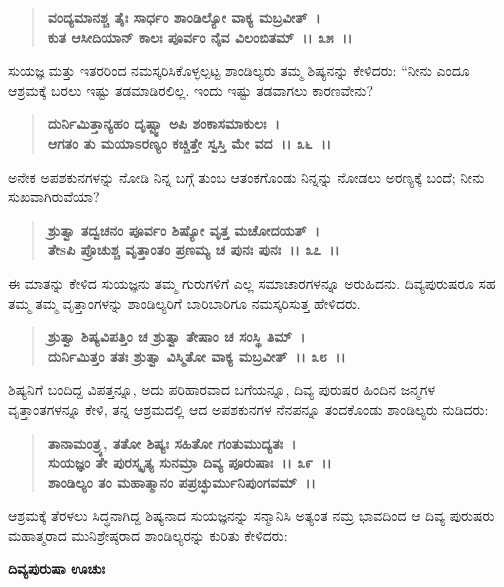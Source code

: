 \begin{verse}
\textbf{ವಂದ್ಯಮಾನಶ್ಚ ತೈಃ ಸಾರ್ಧಂ ಶಾಂಡಿಲ್ಯೋ ವಾಕ್ಯ ಮಬ್ರವೀತ್~।}\\\textbf{ಕುತ ಆಸೀದಿಯಾನ್ ಕಾಲಃ ಪೂರ್ವಂ ನೈವ ವಿಲಂಬಿತಮ್~।। ೩೫~।।}
\end{verse}

ಸುಯಜ್ಞ ಮತ್ತು ಇತರರಿಂದ ನಮಸ್ಕರಿಸಿಕೊಳ್ಳಲ್ಪಟ್ಟ ಶಾಂಡಿಲ್ಯರು ತಮ್ಮ ಶಿಷ್ಯನನ್ನು ಕೇಳಿದರು: “ನೀನು ಎಂದೂ ಆಶ್ರಮಕ್ಕೆ ಬರಲು ಇಷ್ಟು ತಡಮಾಡಿರಲಿಲ್ಲ. ಇಂದು ಇಷ್ಟು ತಡ\-ವಾಗಲು ಕಾರಣವೇನು?

\begin{verse}
\textbf{ದುರ್ನಿಮಿತ್ತಾನ್ಯಹಂ ದೃಷ್ಟ್ವಾ ಅಪಿ ಶಂಕಾಸಮಾಕುಲಃ~।}\\\textbf{ಆಗತಂ ತು ಮಯಾಽರಣ್ಯಂ ಕಚ್ಚಿತ್ತೇ ಸ್ವಸ್ತಿ ಮೇ ವದ~।। ೩೬~।।}
\end{verse}

ಅನೇಕ ಅಪಶಕುನಗಳನ್ನು ನೋಡಿ ನಿನ್ನ ಬಗ್ಗೆ ತುಂಬ ಆತಂಕಗೊಂಡು ನಿನ್ನನ್ನು ನೋಡಲು ಅರಣ್ಯಕ್ಕೆ ಬಂದೆ; ನೀನು ಸುಖವಾಗಿರುವೆಯಾ?

\begin{verse}
\textbf{ಶ್ರುತ್ವಾ ತದ್ವಚನಂ ಪೂರ್ವಂ ಶಿಷ್ಯೋ ವೃತ್ತ ಮಚೋದಯತ್~।}\\\textbf{ತೇsಪಿ ಪ್ರೊಚುಶ್ಚ ವೃತ್ತಾಂತಂ ಪ್ರಣಮ್ಯ ಚ ಪುನಃ ಪುನಃ~।। ೩೭~।।}
\end{verse}

ಈ ಮಾತನ್ನು ಕೇಳಿದ ಸುಯಜ್ಞನು ತಮ್ಮ ಗುರುಗಳಿಗೆ ಎಲ್ಲ ಸಮಾಚಾರಗಳನ್ನೂ ಅರುಹಿದನು. ದಿವ್ಯಪುರುಷರೂ ಸಹ ತಮ್ಮ ತಮ್ಮ ವೃತ್ತಾಂಗಳನ್ನು ಶಾಂಡಿಲ್ಯರಿಗೆ ಬಾರಿಬಾರಿಗೂ ನಮಸ್ಕರಿಸುತ್ತ ಹೇಳಿದರು.

\begin{verse}
\textbf{ಶ್ರುತ್ವಾ ಶಿಷ್ಯವಿಪತ್ತಿಂ ಚ ಶ್ರುತ್ವಾ ತೇಷಾಂ ಚ ಸಂಸ್ಥಿ ತಿಮ್~।}\\\textbf{ದುರ್ನಿಮಿತ್ತಂ ತತಃ ಶ್ರುತ್ವಾ ವಿಸ್ಮಿತೋ ವಾಕ್ಯ ಮಬ್ರವೀತ್~।। ೩೮~।।}
\end{verse}

ಶಿಷ್ಯನಿಗೆ ಬಂದಿದ್ದ ವಿಪತ್ತನ್ನೂ, ಅದು ಪರಿಹಾರವಾದ ಬಗೆಯನ್ನೂ, ದಿವ್ಯ ಪುರುಷರ ಹಿಂದಿನ ಜನ್ಮಗಳ ವೃತ್ತಾಂತಗಳನ್ನೂ ಕೇಳಿ, ತನ್ನ ಆಶ್ರಮದಲ್ಲಿ ಆದ ಅಪಶಕುನಗಳ ನೆನಪನ್ನೂ ತಂದಕೊಂಡು ಶಾಂಡಿಲ್ಯರು ನುಡಿದರು:

\begin{verse}
\textbf{ತಾನಾಮಂತ್ರ್ಯ, ತತೋ ಶಿಷ್ಯಃ ಸಹಿತೋ ಗಂತುಮುದ್ಯತಃ~।}\\\textbf{ಸುಯಜ್ಞಂ ತೇ ಪುರಸ್ಕೃತ್ಯ ಸುನಮ್ರಾ ದಿವ್ಯ ಪೂರುಷಾಃ~।। ೩೯~।।}\\\textbf{ಶಾಂಡಿಲ್ಯಂ ತಂ ಮಹಾತ್ಮಾನಂ ಪಪ್ರಚ್ಛುರ್ಮುನಿಪುಂಗವಮ್~।।}
\end{verse}

ಆಶ್ರಮಕ್ಕೆ ತೆರಳಲು ಸಿದ್ಧನಾಗಿದ್ದ ಶಿಷ್ಯನಾದ ಸುಯಜ್ಞನನ್ನು ಸನ್ಮಾನಿಸಿ ಅತ್ಯಂತ ನಮ್ರ ಭಾವದಿಂದ ಆ ದಿವ್ಯ ಪುರುಷರು ಮಹಾತ್ಮರಾದ ಮುನಿಶ್ರೇಷ್ಠರಾದ ಶಾಂಡಿಲ್ಯರನ್ನು ಕುರಿತು ಕೇಳಿದರು:

\begin{flushleft}
\textbf{ದಿವ್ಯಪುರುಷಾ ಊಚುಃ\enginline{-}}
\end{flushleft}

